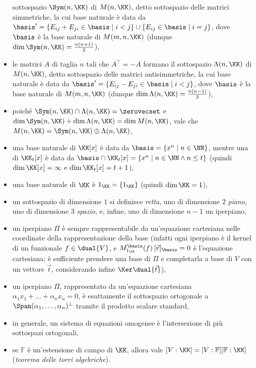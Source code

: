 \documentclass[10pt,landscape]{article}
\begin{document}
\begin{multicols}{3}
\begin{itemize}
			sottospazio $\Sym(n, \KK)$ di $M(n, \KK)$, detto sottospazio delle matrici
			simmetriche, la cui base naturale è data da
			$\basis' = \{E_{ij} + E_{ji} \in \basis \mid i < j\} \cup
			\{E_{ij} \in \basis \mid i = j\}$, dove $\basis$ è la
			base naturale di $M(m, n, \KK)$ (dunque $\dim \Sym(n, \KK) = \frac{n(n+1)}{2}$),
			\item le matrici $A$ di taglia $n$ tali che $A^\top = -A$ formano il
			sottospazio $\Lambda(n, \KK)$ di $M(n, \KK)$, detto sottospazio delle matrici
			antisimmetriche, la cui base naturale è data da
			$\basis' = \{E_{ij} - E_{ji} \in \basis \mid i < j\}$, dove $\basis$ è la
			base naturale di $M(m, n, \KK)$ (dunque $\dim \Lambda(n, \KK) = \frac{n(n-1)}{2}$),
			\item poiché $\Sym(n, \KK) \cap \Lambda(n, \KK) = \zerovecset$ e
			$\dim \Sym(n, \KK) + \dim \Lambda(n, \KK) = \dim M(n, \KK)$,
			vale che $M(n, \KK) = \Sym(n, \KK) \oplus \Lambda(n, \KK)$,
			\item una base naturale di $\KK[x]$ è data da $\basis = \{x^n \mid
			n \in \NN \}$, mentre una di $\KK_t[x]$ è data da $\basis \cap
			\KK_t[x] = \{x^n \mid n \in \NN \land n \leq t\}$ (quindi
			$\dim \KK[x] = \infty$ e $\dim \KK_t[x] = t+1$),
			\item una base naturale di $\KK$ è $1_\KK = \{1_\KK\}$ (quindi
			$\dim \KK = 1$),
			\item un sottospazio di dimensione $1$ si definisce \textit{retta},
			uno di dimensione $2$ \textit{piano}, uno di dimensione $3$
			\textit{spazio}, e, infine, uno di dimensione $n-1$ un iperpiano,
			\item un iperpiano $\Pi$ è sempre rappresentabile da un'equazione cartesiana
			nelle coordinate della rappresentazione della base (infatti ogni
			iperpiano è il kernel di un funzionale $f \in \dual{V}$, e $M^\basis_{1_\KK}(f) \, [\vec{v}]_\basis = 0$ è l'equazione cartesiana; è sufficiente prendere una base di $\Pi$ e completarla
			a base di $V$ con un vettore $\vec{t}$, considerando infine
			$\Ker \dual{\vec{t}}$),
			\item un iperpiano $\Pi$, rappresentato da un'equazione cartesiana $\alpha_1 x_1 + \ldots + \alpha_n x_n = 0$, è esattamente il sottospazio ortogonale a $\Span(\alpha_1, \ldots, \alpha_n)^\perp$ tramite il prodotto scalare standard,
			\item in generale, un sistema di equazioni omogenee è l'intersezione di più
			sottospazi ortogonali,
			\item se $\mathbb{F}$ è un'estensione di campo di $\KK$, allora vale $[V : \KK] = [V : \mathbb{F}] [\mathbb{F} : \KK]$ (\textit{teorema delle torri algebriche}).
			

\end{itemize}
\end{multicols}
\end{document}
